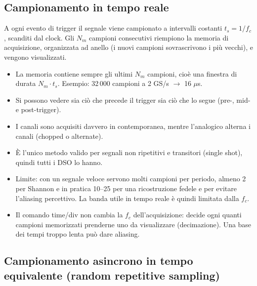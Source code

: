 \documentclass[11pt,a4paper]{article}
\begin{document}
\subsection*{Campionamento in tempo reale}

A ogni evento di trigger il segnale viene campionato a intervalli costanti $t_s = 1/f_c$, scanditi dal clock. Gli $N_m$ campioni consecutivi riempiono la memoria di acquisizione, organizzata ad anello (i nuovi campioni sovrascrivono i più vecchi), e vengono visualizzati.
\begin{itemize}
\item La memoria contiene sempre gli ultimi $N_m$ campioni, cioè una finestra di durata $N_m\cdot t_s$. Esempio: 32\,000 campioni a 2 GS/s $\rightarrow$ 16 $\mu$s.
\item Si possono vedere sia ciò che precede il trigger sia ciò che lo segue (pre-, mid- e post-trigger).
\item I canali sono acquisiti davvero in contemporanea, mentre l'analogico alterna i canali (chopped o alternate).
\item È l'unico metodo valido per segnali non ripetitivi e transitori (single shot), quindi tutti i DSO lo hanno.
\item Limite: con un segnale veloce servono molti campioni per periodo, almeno 2 per Shannon e in pratica 10--25 per una ricostruzione fedele e per evitare l'aliasing percettivo. La banda utile in tempo reale è quindi limitata dalla $f_c$.
\item Il comando time/div non cambia la $f_c$ dell'acquisizione: decide ogni quanti campioni memorizzati prenderne uno da visualizzare (decimazione). Una base dei tempi troppo lenta può dare aliasing.
\end{itemize}

\subsection*{Campionamento asincrono in tempo equivalente (random repetitive sampling)}
\end{document}
